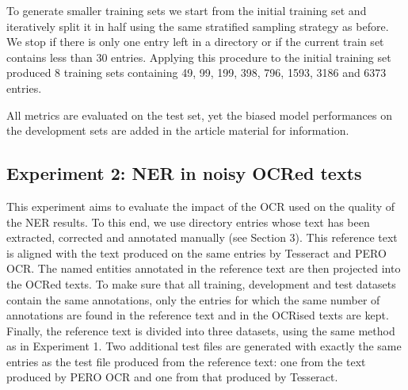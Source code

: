 To generate smaller training sets we start from the initial training set and iteratively split it in half using the same stratified sampling strategy as before.
We stop if there is only one entry left in a directory or if the current train set contains less than 30 entries.
Applying this procedure to the initial training set produced 8 training sets containing 49, 99, 199, 398, 796, 1593, 3186 and 6373 entries.

All metrics are evaluated on the test set, yet the biased model performances on the development sets are added in the article material for information.





\subsection{Experiment 2: NER in noisy OCRed texts}
This experiment aims to evaluate the impact of the OCR used on the quality of the NER results. To this end, we use directory entries whose text has been extracted, corrected and annotated manually (see Section 3). This reference text is aligned with the text produced on the same entries by Tesseract and PERO OCR. The named entities annotated in the reference text are then projected into the OCRed texts. To make sure that all training, development and test datasets contain the same annotations, only the entries for which the same number of annotations are found in the reference text and in the OCRised texts are kept. Finally, the reference text is divided into three datasets, using the same method as in Experiment 1. Two additional test files are generated with exactly the same entries as the test file produced from the reference text: one from the text produced by PERO OCR and one from that produced by Tesseract.




 
